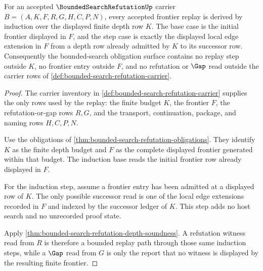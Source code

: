\begin{theorem}
\label{thm:bounded-search-refutation-obligation-scope}
For an accepted $\BoundedSearchRefutationUp$ carrier $B=(A,K,F,R,G,H,C,P,N)$, every accepted frontier replay is derived by induction over the displayed finite depth row $K$. The base case is the initial frontier displayed in $F$, and the step case is exactly the displayed local edge extension in $F$ from a depth row already admitted by $K$ to its successor row. Consequently the bounded-search obligation surface contains no replay step outside $K$, no frontier entry outside $F$, and no refutation or $\Gap$ read outside the carrier rows of \autoref{def:bounded-search-refutation-carrier}.
\end{theorem}
\begin{proof}
The carrier inventory in \autoref{def:bounded-search-refutation-carrier} supplies the only rows used by the replay: the finite budget $K$, the frontier $F$, the refutation-or-gap rows $R,G$, and the transport, continuation, package, and naming rows $H,C,P,N$.

Use the obligations of \autoref{thm:bounded-search-refutation-obligations}. They identify $K$ as the finite depth budget and $F$ as the complete displayed frontier generated within that budget. The induction base reads the initial frontier row already displayed in $F$.

For the induction step, assume a frontier entry has been admitted at a displayed row of $K$. The only possible successor read is one of the local edge extensions recorded in $F$ and indexed by the successor ledger of $K$. This step adds no host search and no unrecorded proof state.

Apply \autoref{thm:bounded-search-refutation-depth-soundness}. A refutation witness read from $R$ is therefore a bounded replay path through those same induction steps, while a $\Gap$ read from $G$ is only the report that no witness is displayed by the resulting finite frontier.
\end{proof}

